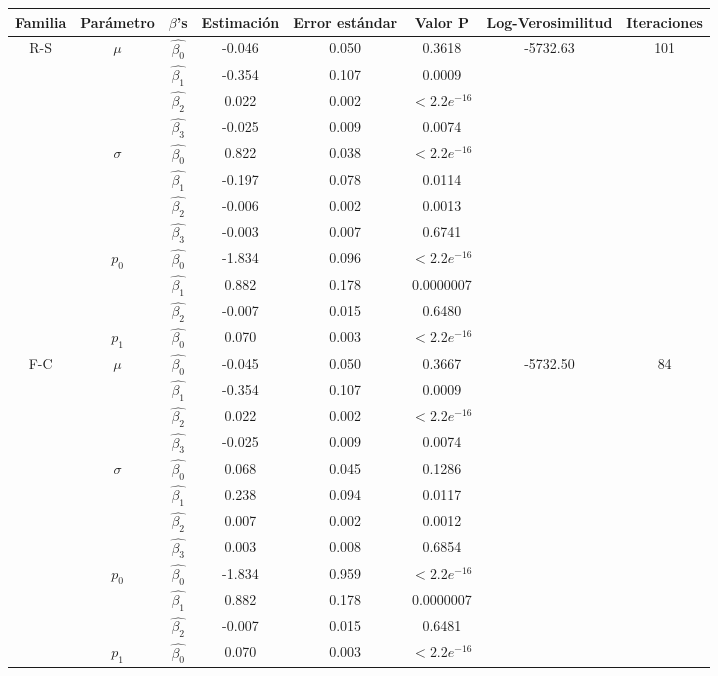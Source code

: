 \begin{table}[!hbt]
{\scriptsize
\begin{center}
\begin{tabular}{|c|c|c|ccc|c|c|}\hline
Familia & Par\'{a}metro & $\beta$'s & Estimaci\'{o}n & Error est\'{a}ndar & Valor P & Log-Verosimilitud & Iteraciones \\ \hline \hline
\multirow{12}{*}{R-S} & \multirow{4}{*}{$\mu$} & $\hat{\beta_0}$ & -0.046	&0.050	&0.3618 & \multirow{12}{*}{-5732.63} & \multirow{12}{*}{101}  \\
& & $\hat{\beta_1}$ & -0.354	&0.107	&0.0009 & &\\
& & $\hat{\beta_2}$ & 0.022	&0.002	&$<2.2e^{-16}$ & & \\
& & $\hat{\beta_3}$ & -0.025	&0.009	&0.0074 & & \\ \cline{2-6}
& \multirow{4}{*}{$\sigma$} & $\hat{\beta_0}$ & 0.822	&0.038	&$<2.2e^{-16}$  & &\\
& & $\hat{\beta_1}$ & -0.197	&0.078	&0.0114  & &\\
& & $\hat{\beta_2}$ & -0.006	&0.002	&0.0013  & &\\
& & $\hat{\beta_3}$ & -0.003	&0.007	&0.6741  & &\\ \cline{2-6}
& \multirow{3}{*}{$p_0$} & $\hat{\beta_0}$ & -1.834	&0.096	&$<2.2e^{-16}$  & &\\
& & $\hat{\beta_1}$ & 0.882	&0.178	&0.0000007  & &\\
& & $\hat{\beta_2}$ & -0.007	&0.015	&0.6480  & &\\ \cline{2-6}
& $p_1$ & $\hat{\beta_0}$ & 0.070	&0.003	&$<2.2e^{-16}$  & &\\ \hline \hline

\multirow{12}{*}{F-C} & \multirow{4}{*}{$\mu$} & $\hat{\beta_0}$ & -0.045	&0.050	&0.3667  & \multirow{12}{*}{-5732.50} & \multirow{12}{*}{84} \\
& & $\hat{\beta_1}$ & -0.354	&0.107	&0.0009   & &\\
& & $\hat{\beta_2}$ & 0.022	&0.002	&$<2.2e^{-16}$   & &\\
& & $\hat{\beta_3}$ & -0.025	&0.009	&0.0074   & &\\ \cline{2-6}
& \multirow{4}{*}{$\sigma$} & $\hat{\beta_0}$ & 0.068	&0.045	&0.1286   & &\\
& & $\hat{\beta_1}$ & 0.238	&0.094	&0.0117   & &\\
& & $\hat{\beta_2}$ & 0.007	&0.002	&0.0012   & &\\
& & $\hat{\beta_3}$ & 0.003	&0.008	&0.6854   & &\\ \cline{2-6}
& \multirow{3}{*}{$p_0$} & $\hat{\beta_0}$ & -1.834	&0.959	&$<2.2e^{-16}$   & &\\
& & $\hat{\beta_1}$ & 0.882	&0.178	&0.0000007   & &\\
& & $\hat{\beta_2}$ & -0.007	&0.015	&0.6481   & &\\ \cline{2-6}
& $p_1$ & $\hat{\beta_0}$ & 0.070	&0.003	&$<2.2e^{-16}$   & &\\ \hline \hline


\end{tabular}
\end{center}}
\end{table}
